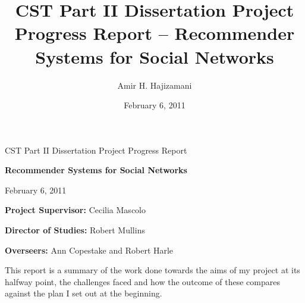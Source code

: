 \documentclass[a4paper,11pt,titlepage]{article}
\title{CST Part II Dissertation Project Progress Report -- Recommender Systems for Social Networks}
\author{Amir H. Hajizamani}
\date{February 6, 2011}
\begin{document}
\begin{titlepage}
\medskip
{}
\medskip
{}

\vfill

\centerline{\large CST Part II Dissertation Project Progress Report}
\vspace{0.4in}
\centerline{\Large\bf Recommender Systems for Social Networks}
\vspace{0.3in}
\centerline{\large{February 6, 2011}}

\vfill

{\bf Project Supervisor:} Cecilia Mascolo

\vspace{0.2in}

{\bf Director of Studies:} Robert Mullins

\vspace{0.2in}

{\bf Overseers:} Ann Copestake and Robert Harle

\vspace{0.2in}

\end{titlepage}

This report is a summary of the work done towards the aims of my project at its 
halfway point, the challenges faced and how the outcome of these compares 
against the plan I set out at the beginning.
\end{document}
